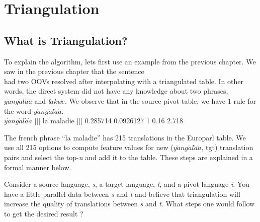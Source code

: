 \chapter{Triangulation}
\label{chap:triangulation}


\section{What is Triangulation?}
\label{sec:triangulation}
To explain the algorithm, lets first use an example from the previous chapter. We saw in the previous chapter that the sentence \mawuexample \\ had two OOVs resolved after interpolating with a triangulated table. In other words, the direct system did not have any knowledge about two phrases, \emph{$y\grave{a}ng\acute{a}l\acute{a}\grave{a}$} and \emph{l$\acute{a}$kw$\acute{e}$}. We observe that in the source pivot table, we have 1 rule for the word \emph{$y\grave{a}ng\acute{a}l\acute{a}\grave{a}$}. \\

\indent
    \emph{$y\grave{a}ng\acute{a}l\acute{a}\grave{a}$} $|||$ la maladie $|||$ 0.285714 0.0926127 1 0.16 2.718\\


\begin{comment}
\begin{figure*}
    \small
    \texttt{[image: files/Figures/ann-triangulation.pdf]}
    \caption{Another example of triangulation}
    \label{fig:ann_depth}
\end{figure*}
\end{comment}

The french phrase ``la maladie'' has 215 translations in the Europarl table. We use all 215 options to compute feature values for new (\emph{$y\grave{a}ng\acute{a}l\acute{a}\grave{a}$}, tgt) translation pairs and select the top-\emph{n} and add it to the table. These steps are explained in a formal manner below. 


Consider a source language, \emph{s}, a target language, \emph{t}, and a pivot language \emph{i}. You have a little parallel data between \emph{s} and \emph{t} and believe that triangulation will increase the quality of translations between \emph{s} and \emph{t}. What steps one would follow to get the desired result ?

